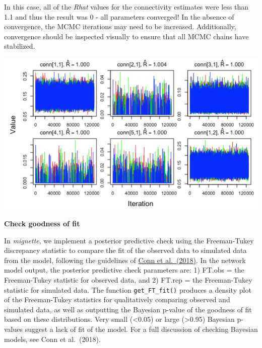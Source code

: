 \documentclass[
]{book}
\newenvironment{Shaded}{\begin{snugshade}}{\end{snugshade}}
\newcommand{\AttributeTok}[1]{\textcolor[rgb]{0.13,0.29,0.53}{#1}}
\newcommand{\DecValTok}[1]{\textcolor[rgb]{0.00,0.00,0.81}{#1}}
\newcommand{\FloatTok}[1]{\textcolor[rgb]{0.00,0.00,0.81}{#1}}
\newcommand{\FunctionTok}[1]{\textcolor[rgb]{0.13,0.29,0.53}{\textbf{#1}}}
\newcommand{\NormalTok}[1]{#1}
\newcommand{\SpecialCharTok}[1]{\textcolor[rgb]{0.81,0.36,0.00}{\textbf{#1}}}
\newcommand{\StringTok}[1]{\textcolor[rgb]{0.31,0.60,0.02}{#1}}
\begin{document}
\begin{Shaded}
\end{Shaded}

In this case, all of the \emph{Rhat} values for the connectivity estimates were less than 1.1 and thus the result was 0 - all parameters converged! In the absence of convergence, the MCMC iterations may need to be increased. Additionally, convergence should be inspected visually to ensure that all MCMC chains have stabilized.

\begin{Shaded}
\end{Shaded}

\includegraphics[width=8.81in]{./images/mcmc_chains1}

\textbf{Check goodness of fit}

In \emph{mignette}, we implement a posterior predictive check using the Freeman-Tukey discrepancy statistic to compare the fit of the observed data to simulated data from the model, following the guidelines of \href{https://doi.org/10.1002/ecm.1314}{Conn et al.~(2018)}. In the network model output, the posterior predictive check parameters are: 1) FT.obs = the Freeman-Tukey statistic for observed data, and 2) FT.rep = the Freeman-Tukey statistic for simulated data. The function \texttt{get\_FT\_fit()} produces a density plot of the Freeman-Tukey statistics for qualitatively comparing observed and simulated data, as well as outputting the Bayesian p-value of the goodness of fit based on these distributions. Very small (\textless0.05) or large (\textgreater0.95) Bayesian p-values suggest a lack of fit of the model. For a full discussion of checking Bayesian models, see Conn et al.~(2018).
\end{document}
